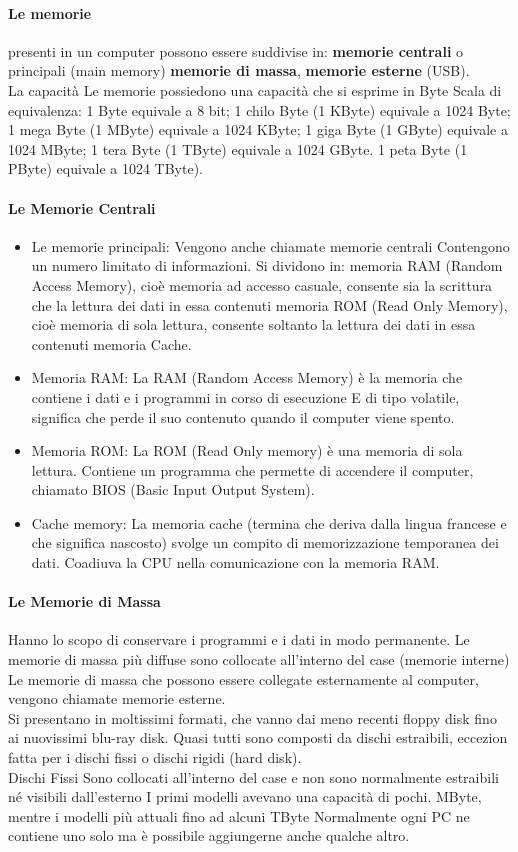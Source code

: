 \documentclass[a4paper]{report}
\begin{document}
\paragraph{Le memorie} presenti in un computer
possono essere suddivise in: \textbf{memorie centrali} o
principali (main memory) \textbf{memorie di massa}, \textbf{memorie
esterne} (USB).\\
La capacità Le memorie possiedono una capacità che si
esprime in Byte Scala di equivalenza: 1 Byte equivale a 8
bit; 1 chilo Byte (1 KByte) equivale a 1024 Byte; 1 mega
Byte (1 MByte) equivale a 1024 KByte; 1 giga Byte (1
GByte) equivale a 1024 MByte; 1 tera Byte (1 TByte)
equivale a 1024 GByte. 1 peta Byte (1 PByte) equivale a
1024 TByte).
\paragraph{Le Memorie Centrali}
\begin{itemize}
\item Le memorie principali: Vengono anche chiamate memorie centrali Contengono
un numero limitato di informazioni. Si dividono in: memoria RAM (Random Access
Memory), cioè memoria ad accesso casuale, consente sia la scrittura che la lettura
dei dati in essa contenuti memoria ROM (Read Only Memory), cioè memoria di
sola lettura, consente soltanto la lettura dei dati in essa contenuti memoria Cache.
\item Memoria RAM: La RAM (Random Access Memory) è la memoria che contiene i
dati e i programmi in corso di esecuzione E di tipo volatile, significa che perde il
suo contenuto quando il computer viene spento.
\item Memoria ROM: La ROM (Read Only memory) è una memoria di sola lettura.
Contiene un programma che permette di accendere il computer, chiamato BIOS
(Basic Input Output System).
\item Cache memory: La memoria cache (termina che deriva dalla lingua francese e
che significa nascosto) svolge un compito di memorizzazione temporanea dei dati.
Coadiuva la CPU nella comunicazione con la memoria RAM.
\end{itemize}

\paragraph{Le Memorie di Massa} Hanno lo scopo di conservare i programmi e i dati in modo permanente. Le
memorie di massa più diffuse sono collocate all'interno del case (memorie
interne) Le memorie di massa che possono essere collegate esternamente
al computer, vengono chiamate memorie esterne.
\\Si presentano in moltissimi formati, che vanno dai meno recenti floppy disk
fino ai nuovissimi blu-ray disk. Quasi tutti sono composti da dischi estraibili,
eccezion fatta per i dischi fissi o dischi rigidi (hard disk).
\\Dischi Fissi Sono collocati all'interno del case e non sono normalmente
estraibili né visibili dall'esterno I primi modelli avevano una capacità di pochi.
MByte, mentre i modelli più attuali fino ad alcuni TByte Normalmente ogni
PC ne contiene uno solo ma è possibile aggiungerne anche qualche altro.
\end{document}
